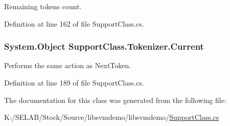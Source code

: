 Remaining tokens count. 



Definition at line 162 of file SupportClass.cs.

\hypertarget{class_support_class_1_1_tokenizer_a7e53bf2574e24fcc0fb2dedb98ea2e86}{
\subsubsection[{Current}]{\setlength{\rightskip}{0pt plus 5cm}System.Object SupportClass.Tokenizer.Current}}
\label{class_support_class_1_1_tokenizer_a7e53bf2574e24fcc0fb2dedb98ea2e86}


Performs the same action as NextToken. 



Definition at line 189 of file SupportClass.cs.



The documentation for this class was generated from the following file:\begin{DoxyCompactItemize}
\item 
K:/SELAB/Stock/Source/libsvmdemo/libsvmdemo/\hyperlink{_support_class_8cs}{SupportClass.cs}\end{DoxyCompactItemize}
